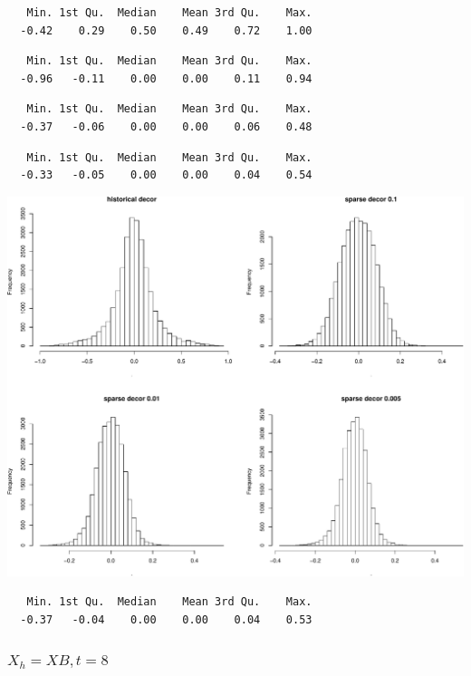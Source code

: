 \documentclass[]{article}
\begin{document}
\begin{verbatim}
   Min. 1st Qu.  Median    Mean 3rd Qu.    Max. 
  -0.42    0.29    0.50    0.49    0.72    1.00 
\end{verbatim}

\begin{verbatim}
   Min. 1st Qu.  Median    Mean 3rd Qu.    Max. 
  -0.96   -0.11    0.00    0.00    0.11    0.94 
\end{verbatim}

\begin{verbatim}
   Min. 1st Qu.  Median    Mean 3rd Qu.    Max. 
  -0.37   -0.06    0.00    0.00    0.06    0.48 
\end{verbatim}

\begin{verbatim}
   Min. 1st Qu.  Median    Mean 3rd Qu.    Max. 
  -0.33   -0.05    0.00    0.00    0.04    0.54 
\end{verbatim}

\includegraphics{Low_levels_covariance_sparse_decorr_files/figure-latex/unnamed-chunk-2-2.pdf}

\begin{verbatim}
   Min. 1st Qu.  Median    Mean 3rd Qu.    Max. 
  -0.37   -0.04    0.00    0.00    0.04    0.53 
\end{verbatim}

\subsubsection{\texorpdfstring{\(X_h = XB, t = 8\)}{X\_h = XB, t = 8}}\label{x_h-xb-t-8}
\end{document}
